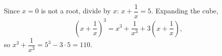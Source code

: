 Since $x=0$ is not a root, divide by $x$: $x+\dfrac{1}{x}=5$. Expanding the cube,
\[
\left(x+\dfrac{1}{x}\right)^3=x^3+\dfrac{1}{x^3}+3\left(x+\dfrac{1}{x}\right),
\]
so $x^3+\dfrac{1}{x^3}=5^3-3\cdot5=\boxed{110}$.
